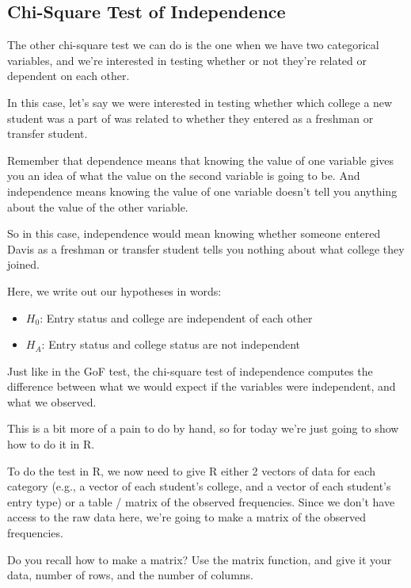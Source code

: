 \documentclass[
  letterpaper,
  DIV=11,
  numbers=noendperiod]{scrartcl}
\begin{document}
\subsection{Chi-Square Test of
Independence}\label{chi-square-test-of-independence}

The other chi-square test we can do is the one when we have two
categorical variables, and we're interested in testing whether or not
they're related or dependent on each other.

In this case, let's say we were interested in testing whether which
college a new student was a part of was related to whether they entered
as a freshman or transfer student.

Remember that dependence means that knowing the value of one variable
gives you an idea of what the value on the second variable is going to
be. And independence means knowing the value of one variable doesn't
tell you anything about the value of the other variable.

So in this case, independence would mean knowing whether someone entered
Davis as a freshman or transfer student tells you nothing about what
college they joined.

Here, we write out our hypotheses in words:

\begin{itemize}
\item
  \(H_0\): Entry status and college are independent of each other
\item
  \(H_A\): Entry status and college status are not independent
\end{itemize}

Just like in the GoF test, the chi-square test of independence computes
the difference between what we would expect if the variables were
independent, and what we observed.

This is a bit more of a pain to do by hand, so for today we're just
going to show how to do it in R.

To do the test in R, we now need to give R either 2 vectors of data for
each category (e.g., a vector of each student's college, and a vector of
each student's entry type) or a table / matrix of the observed
frequencies. Since we don't have access to the raw data here, we're
going to make a matrix of the observed frequencies.

Do you recall how to make a matrix? Use the matrix function, and give it
your data, number of rows, and the number of columns.
\end{document}
